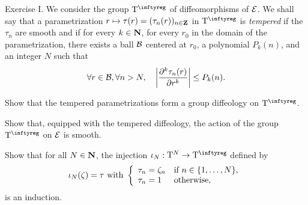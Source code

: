 
\begin{Article}{Exercise I.}{}
  We consider the group $\Torus^\infty$ of diffeomorphisms of $\mathcal{E}$.
  We shall say that a parametrization $r \mapsto \tau(r) = (\tau_n(r))_{n\in \mathbf{Z}}$ in $\Torus^\infty$ is {\em tempered} if the $\tau_n$ are smooth and if for every $k \in \mathbf{N}$,
  for every $r_0$ in the domain of the parametrization,
  there exists a ball $\mathcal{B}$ centered at $r_0$,
  a polynomial $P_k(n)$,
  and an integer $N$ such that
  \begin{equation}
    \renewcommand{\theequation}{$\spadesuit$}
    \forall r \in \cB, \forall n > N, \quad \left|{\partial^k \tau_n(r) \over \partial r^k}\right| \leq P_k(n).
  \end{equation}
  
   Show that the tempered parametrizations form a group diffeology on $\Torus^\infty$.
  
   Show that, equipped with the tempered diffeology, the action of the group $\Torus^\infty$
  on $\mathcal{E}$ is smooth.
  
   Show that for all $N \in \mathbf{N}$, the injection $\iota_N : \Torus^N \to \Torus^\infty$ defined
  by
  $$
    \iota_N(\zeta) = \tau \ \text{with}\   \left\{
    \begin{array}{ll}
    \tau_n = \zeta_n & \mbox{if $n \in \{1,\ldots,N\}$}, \\
    \tau_n = 1  & \mbox{otherwise},
    \end{array}
    \right.
    $$
  is an induction.
\end{Article}

